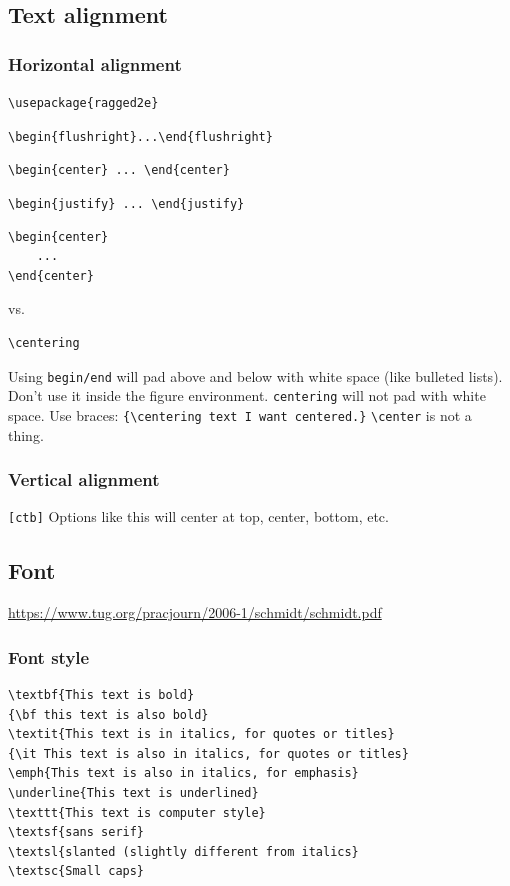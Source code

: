 \documentclass{article}
\begin{document}
\subsection{Text alignment}
\subsubsection{Horizontal alignment}
\verb|\usepackage{ragged2e}|
\begin{itemize*}
    \item \verb|\begin{flushright}...\end{flushright}|
    \item \verb|\begin{center} ... \end{center}|
    \item \verb|\begin{justify} ... \end{justify}|
\end{itemize*}

\begin{verbatim}
\begin{center}
    ...
\end{center}
\end{verbatim}
vs.
\begin{verbatim}
\centering
\end{verbatim}

Using \verb|begin/end| will pad above and
below with white space (like bulleted lists). Don't use it inside the figure
environment. \verb|centering| will not pad with white space.
Use braces: \verb|{\centering text I want centered.}|
\verb|\center| is not a thing.

\subsubsection{Vertical alignment}
\verb|[ctb]| Options like this will center at top, center, bottom, etc.

\subsection{Font}

\url{https://www.tug.org/pracjourn/2006-1/schmidt/schmidt.pdf}

\subsubsection{Font style}
\begin{verbatim}
\textbf{This text is bold}
{\bf this text is also bold}
\textit{This text is in italics, for quotes or titles}
{\it This text is also in italics, for quotes or titles}
\emph{This text is also in italics, for emphasis}
\underline{This text is underlined}
\texttt{This text is computer style}
\textsf{sans serif}
\textsl{slanted (slightly different from italics}
\textsc{Small caps}
\end{verbatim}
\end{document}
